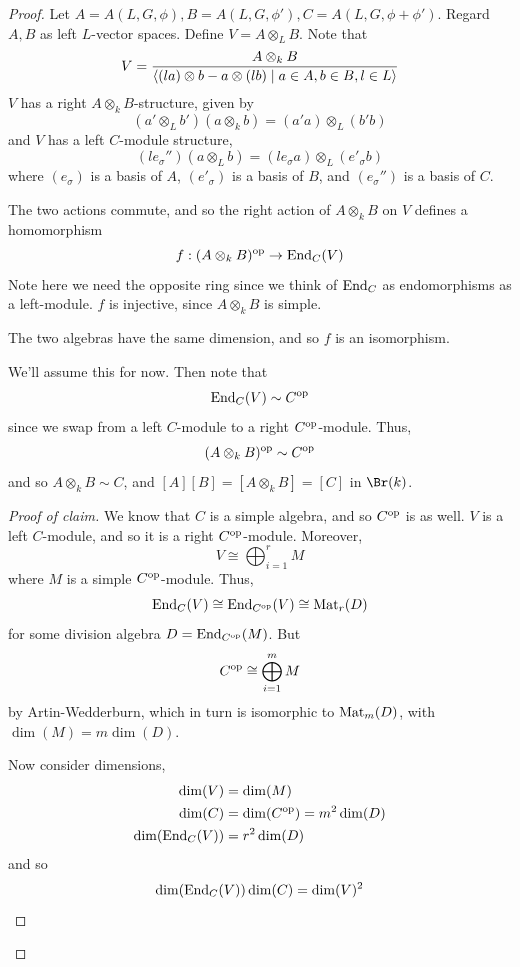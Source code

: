 \documentclass{article}
\begin{document}
\begin{proof}
    Let \(A = A(L, G, \phi), B = A(L, G, \phi'), C = A(L, G, \phi + \phi')\). Regard \(A, B\) as left \(L\)-vector spaces. Define \(V = A \otimes_L B\). Note that
    \[V = \frac{A \otimes_k B}{\left\langle (la) \otimes b - a \otimes (lb) \mid a \in A, b \in B, l \in L \right\rangle}\]
    \(V\) has a right \(A \otimes_k B\)-structure, given by
    \[(a' \otimes_L b')(a \otimes_k b) = (a'a) \otimes_L (b'b)\]
    and \(V\) has a left \(C\)-module structure,
    \[(le_\sigma'')(a \otimes_L b) = (le_\sigma a) \otimes_L (e'_\sigma b)\]
    where \((e_\sigma)\) is a basis of \(A\), \((e'_\sigma)\) is a basis of \(B\), and \((e_\sigma'')\) is a basis of \(C\).

    The two actions commute, and so the right action of \(A \otimes_k B\) on \(V\) defines a homomorphism
    \[f : (A \otimes_k B)^{\mathrm{op}} \to \operatorname{End}_C(V)\]
    Note here we need the opposite ring since we think of \(\operatorname{End}_C\) as endomorphisms as a left-module. \(f\) is injective, since \(A \otimes_k B\) is simple.

    \begin{claim}
        The two algebras have the same dimension, and so \(f\) is an isomorphism.
    \end{claim}

    We'll assume this for now. Then note that
    \[\operatorname{End}_C(V) \sim C^{\mathrm{op}}\]
    since we swap from a left \(C\)-module to a right \(C^{\mathrm{op}}\)-module. Thus,
    \[(A \otimes_k B)^{\mathrm{op}} \sim C^{\mathrm{op}}\]
    and so \(A \otimes_k B \sim C\), and \([A][B] = [A \otimes_k B] = [C]\) in \(\Br(k)\).

    \begin{proof}
        [Proof of claim]
        We know that \(C\) is a simple algebra, and so \(C^{\mathrm{op}}\) is as well. \(V\) is a left \(C\)-module, and so it is a right \(C^{\mathrm{op}}\)-module. Moreover,
        \[V \cong \bigoplus_{i=1}^r M\]
        where \(M\) is a simple \(C^{\mathrm{op}}\)-module. Thus,
        \[\operatorname{End}_C(V) \cong \operatorname{End}_{C^{\mathrm{op}}}(V) \cong \operatorname{Mat}_r(D)\]
        for some division algebra \(D = \operatorname{End}_{C^{\mathrm{op}}}(M)\). But
        \[C^{\mathrm{op}} \cong \bigoplus_{i=1}^m M\]
        by Artin-Wedderburn, which in turn is isomorphic to \(\operatorname{Mat}_m(D)\), with \(\dim(M) = m\dim(D)\).
        
        Now consider dimensions,
        \begin{align*}
            \dim(V) &= \dim(M) \\
            \dim(C) &= \dim(C^{\mathrm{op}}) = m^2\dim(D) \\
            \dim(\operatorname{End}_C(V)) &= r^2\dim(D)
        \end{align*}
        and so
        \[\dim(\operatorname{End}_C(V))\dim(C) = \dim(V)^2\]
    \end{proof}
\end{proof}
\end{document}
